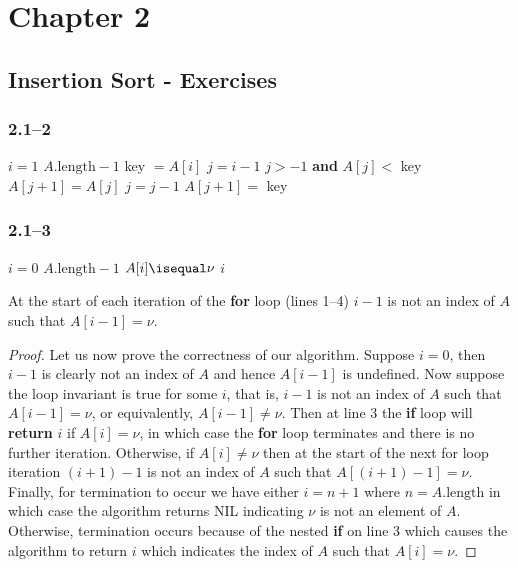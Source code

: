 \section{Chapter 2}
\label{sec:chapter2}

\subsection{Insertion Sort - Exercises}

\subsubsection*{2.1--2}

\begin{codebox}
	\li \For $i = 1$ \To $A.\text{length}-1$
	\li	\Do
				key $= A[i]$
	\li 	$j = i - 1$
	\li		\While $j > -1$ \textbf{and} $A[j] <$ key
	\li		\Do
					$A[j+1] = A[j]$
	\li			$j = j - 1$
				\End
	\li		$A[j+1] =$ key
			\End
\end{codebox}

\subsubsection*{2.1--3}

\begin{codebox}
	\li \For $i = 0$ \To $A.\text{length}-1$
	\li \Do
				\If $A[i] \isequal \nu$
	\li		\Then
					\Return $i$
				\End
			\End
	\li		\Return {}
\end{codebox}

\begin{invariant}
	At the start of each iteration of the \textbf{for} loop (lines 1--4) $i-1$ is not an index of $A$ such that $A[i-1]=\nu$.
\end{invariant}

\begin{proof}
	Let us now prove the correctness of our algorithm. Suppose $i=0$, then $i-1$ is clearly not an index of $A$ and hence $A[i-1]$ is undefined. Now suppose the loop invariant is true for some $i$, that is, $i-1$ is not an index of $A$ such that $A[i-1]=\nu$, or equivalently, $A[i-1]\neq\nu$. Then at line 3 the \textbf{if} loop will \textbf{return} $i$ if $A[i]=\nu$, in which case the \textbf{for} loop terminates and there is no further iteration. Otherwise, if $A[i]\neq\nu$ then at the start of the next for loop iteration $(i+1)-1$ is not an index of $A$ such that $A[(i+1)-1]=\nu$. Finally, for termination to occur we have either $i=n+1$ where $n=A.\text{length}$ in which case the algorithm returns NIL indicating $\nu$ is not an element of $A$. Otherwise, termination occurs because of the nested \textbf{if} on line 3 which causes the algorithm to return $i$ which indicates the index of $A$ such that $A[i]=\nu$.
\end{proof}

